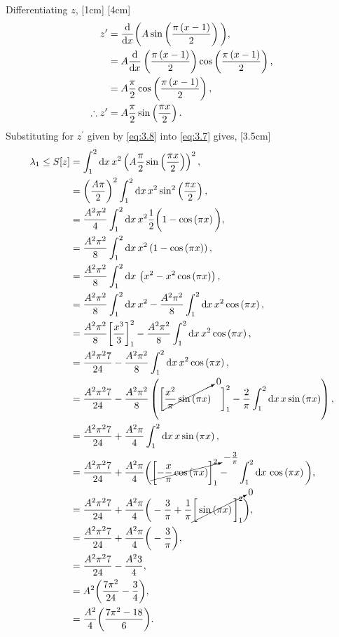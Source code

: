 Differentiating $z$,
[1cm]
[4cm]
\begin{align}
	z^\prime &= \frac{\mathrm{d}}{\mathrm{d}x}\bigg(A\sin\left(\frac{\pi\left(x-1\right)}{2}\right)\bigg),\nonumber\\
	&= A\frac{\mathrm{d}}{\mathrm{d}x}\left(\frac{\pi\left(x-1\right)}{2}\right)\cos\left(\frac{\pi\left(x-1\right)}{2}\right),\nonumber\\
	&= A\frac{\pi}{2}\cos\left(\frac{\pi\left(x-1\right)}{2}\right),\nonumber\\
	\label{eq:3.8}
	\therefore z^\prime&= A\frac{\pi}{2}\sin\left(\frac{\pi x}{2}\right).
\end{align}
Substituting for $z^\prime$ given by \eqref{eq:3.8} into \eqref{eq:3.7} gives,
[3.5cm]
\begin{align}
	\lambda_1 \leq S[z] &= \int_{1}^{2}\mathrm{d} x\, x^2 \left(A\frac{\pi}{2}\sin\left(\frac{\pi x}{2}\right)\right)^2,\nonumber\\
	&=\left(\frac{A\pi}{2}\right)^2\int_{1}^{2}\mathrm{d} x\, x^2 \sin^2\left(\frac{\pi x}{2}\right),\nonumber\\
	&=\frac{A^2\pi^2}{4}\int_{1}^{2}\mathrm{d} x\, x^2 \frac{1}{2}\bigg(1-\cos\left(\pi x\right)\bigg),\nonumber\\
	&= \frac{A^2\pi^2}{8}\int_{1}^{2}\mathrm{d} x\, x^2 \left(1-\cos\left(\pi x\right)\right),\nonumber\\
	&= \frac{A^2\pi^2}{8}\int_{1}^{2}\mathrm{d} x\, \left(x^2 - x^2\cos\left(\pi x\right)\right),\nonumber\\
	&= \frac{A^2\pi^2}{8}\int_{1}^{2}\mathrm{d} x\, x^2 - \frac{A^2\pi^2}{8}\int_{1}^{2}\mathrm{d} x\, x^2\cos\left(\pi x\right),\nonumber\\
	&= \frac{A^2\pi^2}{8}\bigg[\frac{x^3}{3}\bigg]_1^2 - \frac{A^2\pi^2}{8}\int_{1}^{2}\mathrm{d} x\, x^2\cos\left(\pi x\right),\nonumber\\
	&= \frac{A^2\pi^2 7}{24} - \frac{A^2\pi^2}{8}\int_{1}^{2}\mathrm{d} x\, x^2\cos\left(\pi x\right),\nonumber\\
	&= \frac{A^2\pi^2 7}{24} - \frac{A^2\pi^2}{8}\left(\bigg[\cancelto{0}{\frac{x^2}{\pi}\sin\left(\pi x\right)}\quad\bigg]_1^2 - \frac{2}{\pi}\int_{1}^{2}\mathrm{d} x\, x\sin\left(\pi x\right)\right),\nonumber\\
	&= \frac{A^2\pi^2 7}{24} + \frac{A^2\pi}{4}\int_{1}^{2}\mathrm{d} x\, x\sin\left(\pi x\right),\nonumber\\
	&= \frac{A^2\pi^2 7}{24} + \frac{A^2\pi}{4}\bigg(\cancelto{-\frac{3}{\pi}}{\bigg[{-\frac{x}{\pi}\cos\left(\pi x\right)}\bigg]_1^2} - \quad\int_{1}^{2}\mathrm{d} x\,\cos\left(\pi x\right)\bigg),\nonumber\\
	&= \frac{A^2\pi^2 7}{24} + \frac{A^2\pi}{4}\bigg(-\frac{3}{\pi} + \frac{1}{\pi}\cancelto{0}{\bigg[\sin\left(\pi x\right)\bigg]_1^2}\bigg),\nonumber\\
	&= \frac{A^2\pi^2 7}{24} + \frac{A^2\pi}{4}\bigg(-\frac{3}{\pi}\bigg),\nonumber\\
	&= \frac{A^2\pi^2 7}{24} - \frac{A^2 3}{4},\nonumber\\
	&= A^2\bigg(\frac{ 7\pi^2}{24} - \frac{3}{4}\bigg),\nonumber\\
	\label{eq:3.9}
	&= \frac{A^2}{4}\bigg(\frac{ 7\pi^2 -18}{6}\bigg).
\end{align}

